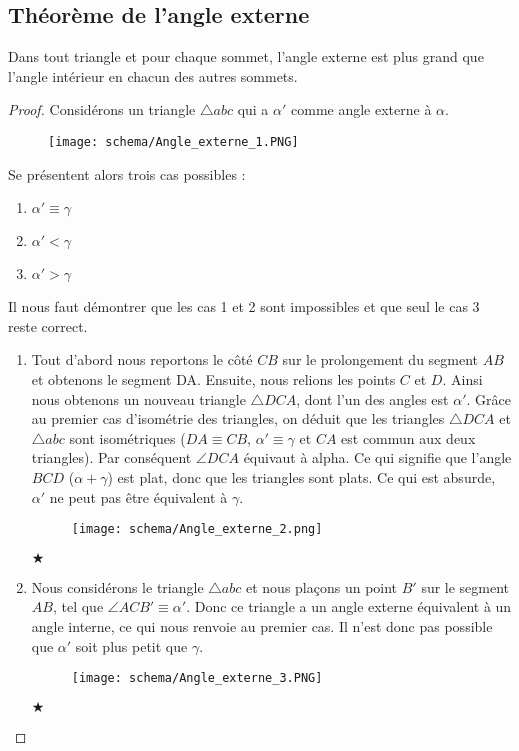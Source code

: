 \documentclass[a4paper,12pt]{article}
\begin{document}
\subsection{Théorème de l'angle externe}
\begin{theorem}
Dans tout triangle et pour chaque sommet, l'angle externe est plus grand que l'angle intérieur en chacun des autres sommets.
\end{theorem}

\begin{proof}
Considérons un triangle $\triangle abc$ qui a $\alpha'$ comme angle externe à $\alpha$.
\begin{figure}[H]
    \centering
    \texttt{[image: schema/Angle\_externe\_1.PNG]}
\end{figure}

Se présentent alors trois cas possibles :

\begin{enumerate}
    \item $\alpha'  \equiv \gamma$
    \item $\alpha' < \gamma$
    \item $\alpha' > \gamma$
\end{enumerate}
Il nous faut démontrer que les cas 1 et 2 sont impossibles et que seul le cas 3 reste correct.
\begin{enumerate}

    \item Tout d'abord nous reportons le côté $CB$ sur le prolongement du segment $AB$ et obtenons le segment DA. Ensuite, nous relions les points $C$ et $D$. Ainsi nous obtenons un nouveau triangle $\triangle DCA$, dont l'un des angles est $\alpha'$.
	Grâce au premier cas d'isométrie des triangles, on déduit que les triangles $\triangle DCA$ et $\triangle abc$ sont isométriques ($DA \equiv CB$, $\alpha'\equiv \gamma$ et $CA$ est commun aux deux triangles). 
	Par conséquent $\angle{DCA}$ équivaut à alpha. Ce qui signifie que l'angle $BCD$ ($\alpha + \gamma$) est plat, donc que les triangles sont plats.
	Ce qui est absurde, $\alpha'$ ne peut pas être équivalent à $\gamma$. 
    \begin{figure}[H]
        \centering
        \texttt{[image: schema/Angle\_externe\_2.png]}
    \end{figure}
	\begin{flushright}
    $\bigstar $
    \end{flushright}
    
    \item Nous considérons le triangle $\triangle abc$ et nous plaçons un point $B'$ sur le segment $AB$, tel que $\angle{ACB'} \equiv \alpha'$.
     Donc ce triangle a un angle externe équivalent à un angle interne, ce qui nous renvoie au premier cas. 
     Il n'est donc pas possible que $\alpha'$ soit plus petit que $\gamma$.
     \begin{figure}[H]
    \centering
    \texttt{[image: schema/Angle\_externe\_3.PNG]}
\end{figure}
     \begin{flushright}
    $\bigstar $
    \end{flushright}


\end{enumerate}
\end{proof}
\end{document}
